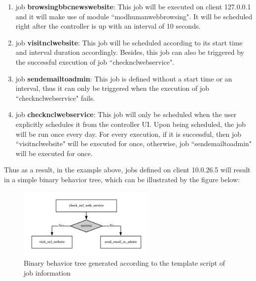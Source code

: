 \documentclass[12pt]{report}
\begin{document}
\begin{enumerate}
\item job \textbf{browsing\textunderscore bbc\textunderscore news\textunderscore website}: This job will be executed on client 127.0.0.1 and it will make use of module ``mod\textunderscore human\textunderscore web\textunderscore browsing". It will be scheduled right after the controller is up with an interval of 10 seconds.

\item job \textbf{visit\textunderscore ncl\textunderscore website}: This job will be scheduled according to its start time and interval duration accordingly. Besides, this job can also be triggered by the successful execution of job ``check\textunderscore ncl\textunderscore web\textunderscore service".

\item job \textbf{send\textunderscore email\textunderscore to\textunderscore admin}: This job is defined without a start time or an interval, thus it can only be triggered when the execution of job ``check\textunderscore ncl\textunderscore web\textunderscore service" fails.

\item job \textbf{check\textunderscore ncl\textunderscore web\textunderscore service}: This job will only be scheduled when the user explicitly schedules it from the controller UI. Upon being scheduled, the job will be run once every day. For every execution, if it is successful, then job ``visit\textunderscore ncl\textunderscore website" will be executed for once, otherwise, job ``send\textunderscore email\textunderscore to\textunderscore admin" will be executed for once.
\end{enumerate}

Thus as a result, in the example above, jobs defined on client 10.0.26.5 will result in a simple binary behavior tree, which can be illustrated by the figure below:

\begin{figure}[h!]
	\centering
	\includegraphics[width=0.6\textwidth]{./pictures/template-bbt}
	\caption{Binary behavior tree generated according to the template script of job
	\label{fig:temp-bbt} information}
\end{figure}
\end{document}
